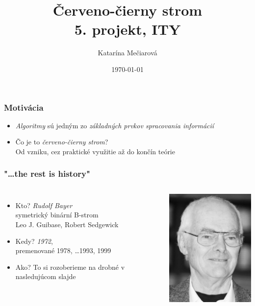 \documentclass{beamer}
\date{\today}
\title{Červeno-čierny strom \\ 5. projekt, ITY}
\author{Katarína Mečiarová}
\begin{document}
    \frame[plain]{\titlepage}

    \begin{frame}
        \frametitle{Motivácia}
        \begin{itemize}
            \item \emph{Algoritmy} sú jedným zo \emph{základných prvkov spracovania informácií}
            \vfill
            \item Čo je to \emph{červeno-čierny strom}?
            \vspace{10pt}
            \\ \footnotesize{Od vzniku, cez praktické využitie až do končín teórie}
        \end{itemize}
    \end{frame}

    \begin{frame}
        \frametitle{"\ldots the rest is history"}
        \begin{columns}
            \begin{itemize}
                \item Kto? \emph{Rudolf Bayer}
                \vspace{5pt} \\ \footnotesize{symetrický binární B-strom} \vspace{10pt} \\
                Leo J. Guibase, Robert Sedgewick
                \vspace{10pt} \\
                \item \normalsize{Kedy}? \emph{1972}, \\ \vspace{5pt}
                {\footnotesize{premenované 1978, \ldots 1993, 1999}}  \vspace{15pt}
                \item Ako? \footnotesize{To si rozoberieme na drobné v nasledujúcom slajde}
            \end{itemize}
            \includegraphics[width=150pt]{bayer}
        \end{columns}
    \end{frame}
\end{document}
